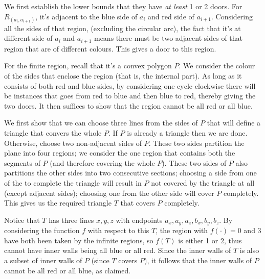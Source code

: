 \documentclass[11pt,a4paper]{article}
\begin{document}
\begin{enumerate}
	We first establish the lower bounds that they have \emph{at least} 1 or 2 doors. For $R_{(a_i, a_{i+1})}$, it's adjacent to the blue side of $a_i$ and red side of $a_{i+1}$. Considering all the sides of that region, (excluding the circular arc), the fact that it's at different side of $a_i$ and $a_{i+1}$ means there must be two adjacent sides of that region that are of different colours. This gives a door to this region. 
	
	For the finite region, recall that it's a convex polygon $P$. We consider the colour of the sides that enclose the region (that is, the internal part). As long as it consists of both red and blue sides, by considering one cycle clockwise there will be instances that goes from red to blue and then blue to red, thereby giving the two doors. It then suffices to show that the region cannot be all red or all blue. 
	
	We first show that we can choose three lines from the sides of $P$ that will define a triangle that convers the whole $P$. If $P$ is already a triangle then we are done. Otherwise, choose two non-adjacent sides of $P$. These two sides partition the plane into four regions; we consider the one region that contains both the segments of $P$ (and therefore covering the whole $P$). 
	These two sides of $P$ also partitions the other sides into two consecutive sections; 
	choosing a side from one of the to complete the triangle will result in $P$ not covered by the triangle at all (except adjacent sides); choosing one from the other side will cover $P$ completely. This gives us the required triangle $T$ that covers $P$ completely. 
	
	Notice that $T$ has three lines $x, y, z$ with endpoints $a_x, a_y, a_z, b_x, b_y, b_z$. By considering the function $f$ with respect to this $T$, the region with $f(\cdot)=0$ and 3 have both been taken by the infinite regions, so $f(T)$ is either 1 or 2, thus cannot have inner walls being all blue or all red. Since the inner walls of $T$ is also a subset of inner walls of $P$ (since $T$ covers $P$), it follows that the inner walls of $P$ cannot be all red or all blue, as claimed. 
	

\end{enumerate}
\end{document}
